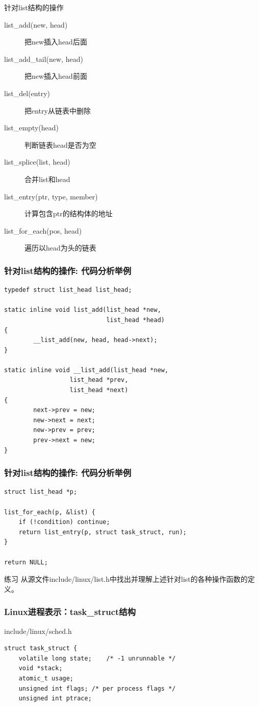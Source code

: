 \documentclass[xcolor=svgnames]{beamer}
\begin{document}
\begin{CJK*}{UTF8}{gbsn}
\begin{frame}{针对list结构的操作}
\begin{description}
\item[list\_add(new, head)] 把new插入head后面
\item[list\_add\_tail(new, head)] 把new插入head前面
\item[list\_del(entry)] 把entry从链表中删除
\item[list\_empty(head)] 判断链表head是否为空
\item[list\_splice(list, head)] 合并list和head
\item[list\_entry(ptr, type, member)] 计算包含ptr的结构体的地址
\item[list\_for\_each(pos, head)] 遍历以head为头的链表
\end{description}
\end{frame}

\begin{frame}[fragile]
\frametitle{针对list结构的操作: 代码分析举例}
\begin{verbatim}
typedef struct list_head list_head;

static inline void list_add(list_head *new, 
                            list_head *head)
{
        __list_add(new, head, head->next);
}

static inline void __list_add(list_head *new,
                  list_head *prev,
                  list_head *next)
{
        next->prev = new;
        new->next = next;
        new->prev = prev;
        prev->next = new;
}
\end{verbatim}
\end{frame}

\begin{frame}[fragile]
\frametitle{针对list结构的操作: 代码分析举例}
\begin{verbatim}
struct list_head *p;

list_for_each(p, &list) {
    if (!condition) continue;
    return list_entry(p, struct task_struct, run);
}

return NULL;
\end{verbatim}
\begin{block}{练习}
从源文件include/linux/list.h中找出并理解上述针对list的各种操作函数的定义。
\end{block}
\end{frame}


\begin{frame}[fragile]
\frametitle{Linux进程表示：task\_struct结构}
\begin{block}{include/linux/sched.h}
\begin{verbatim}
struct task_struct {
    volatile long state;    /* -1 unrunnable */
    void *stack;
    atomic_t usage;
    unsigned int flags; /* per process flags */
    unsigned int ptrace;


\end{verbatim}
\end{block}
\end{frame}
\end{CJK*}
\end{document}
